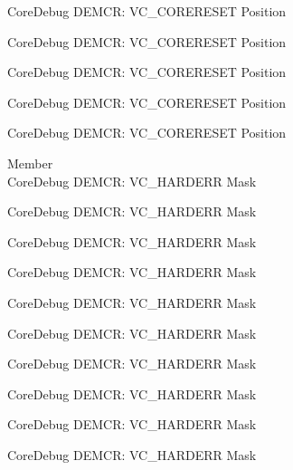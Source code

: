 \begin{DoxyRefList}
\label{deprecated__deprecated000935}%
%
Core\+Debug DEMCR\+: VC\+\_\+\+CORERESET Position 

\label{deprecated__deprecated001014}%
%
Core\+Debug DEMCR\+: VC\+\_\+\+CORERESET Position 

\label{deprecated__deprecated001090}%
%
Core\+Debug DEMCR\+: VC\+\_\+\+CORERESET Position 

\label{deprecated__deprecated001179}%
%
Core\+Debug DEMCR\+: VC\+\_\+\+CORERESET Position 

\label{deprecated__deprecated001281}%
%
Core\+Debug DEMCR\+: VC\+\_\+\+CORERESET Position  
\item[Member \doxylink{group___c_m_s_i_s___core_debug_ga803fc98c5bb85f10f0347b23794847d1}{Core\+Debug\+\_\+\+DEMCR\+\_\+\+VC\+\_\+\+HARDERR\+\_\+\+Msk} ]\hfill \\
\label{deprecated__deprecated000056}%
%
Core\+Debug DEMCR\+: VC\+\_\+\+HARDERR Mask 

\label{deprecated__deprecated000136}%
%
Core\+Debug DEMCR\+: VC\+\_\+\+HARDERR Mask 

\label{deprecated__deprecated000200}%
%
Core\+Debug DEMCR\+: VC\+\_\+\+HARDERR Mask 

\label{deprecated__deprecated000275}%
%
Core\+Debug DEMCR\+: VC\+\_\+\+HARDERR Mask 

\label{deprecated__deprecated000342}%
%
Core\+Debug DEMCR\+: VC\+\_\+\+HARDERR Mask 

\label{deprecated__deprecated000418}%
%
Core\+Debug DEMCR\+: VC\+\_\+\+HARDERR Mask 

\label{deprecated__deprecated000507}%
%
Core\+Debug DEMCR\+: VC\+\_\+\+HARDERR Mask 

\label{deprecated__deprecated000609}%
%
Core\+Debug DEMCR\+: VC\+\_\+\+HARDERR Mask 

\label{deprecated__deprecated000715}%
%
Core\+Debug DEMCR\+: VC\+\_\+\+HARDERR Mask 

\label{deprecated__deprecated000795}%
%
Core\+Debug DEMCR\+: VC\+\_\+\+HARDERR Mask 


\end{DoxyRefList}
